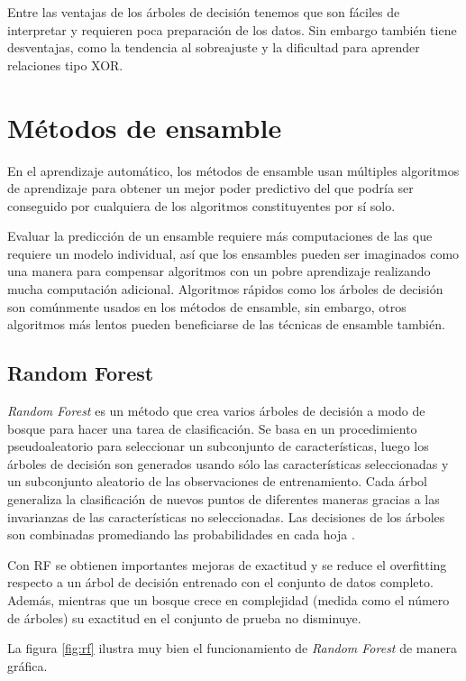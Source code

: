 Entre las ventajas de los árboles de decisión tenemos que son fáciles de interpretar y requieren poca preparación de los datos. Sin embargo también tiene desventajas, como la tendencia al sobreajuste y la dificultad para aprender relaciones tipo XOR.

\section{Métodos de ensamble}

En el aprendizaje automático, los métodos de ensamble usan múltiples algoritmos de aprendizaje para obtener un mejor poder predictivo del que podría ser conseguido por cualquiera de los algoritmos constituyentes por sí solo.

Evaluar la predicción de un ensamble requiere más computaciones de las que requiere un modelo individual, así que los ensambles pueden ser imaginados como una manera para compensar algoritmos con un pobre aprendizaje realizando mucha computación adicional. Algoritmos rápidos como los árboles de decisión son comúnmente usados en los métodos de ensamble, sin embargo, otros algoritmos más lentos pueden beneficiarse de las técnicas de ensamble también.

\subsection{Random Forest}

\textit{Random Forest} es un método que crea varios árboles de decisión a modo de bosque para hacer una tarea de clasificación. Se basa en un procedimiento pseudoaleatorio para seleccionar un subconjunto de características, luego los árboles de decisión son generados usando sólo las características seleccionadas y un subconjunto aleatorio de las observaciones de entrenamiento. Cada árbol generaliza la clasificación de nuevos puntos de diferentes maneras gracias a las invarianzas de las características no seleccionadas. Las decisiones de los árboles son combinadas promediando las probabilidades en cada hoja \citep{ho1998random}.

Con \ac{RF} se obtienen importantes mejoras de exactitud y se reduce el overfitting respecto a un árbol de decisión entrenado con el conjunto de datos completo. Además, mientras que un bosque crece en complejidad (medida como el número de árboles) su exactitud en el conjunto de prueba no disminuye.

La figura \ref{fig:rf} ilustra muy bien el funcionamiento de \textit{Random Forest} de manera gráfica.

